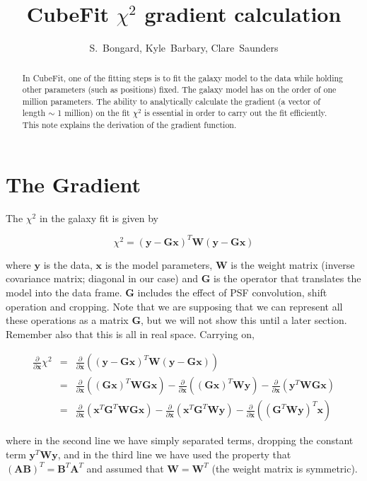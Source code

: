\documentclass[12pt]{article}
\newcommand{\G}{\mathbf{G}}
\newcommand{\x}{\mathbf{x}}
\newcommand{\y}{\mathbf{y}}
\newcommand{\W}{\mathbf{W}}
\newcommand{\ddx}{\frac{\partial}{\partial \mathbf{x}}}
\begin{document}
\title{CubeFit $\chi^2$ gradient calculation}
\author{S.~Bongard, Kyle~Barbary, Clare~Saunders}
\maketitle
\begin{abstract}
In CubeFit, one of the fitting steps is to fit the galaxy model to the
data while holding other parameters (such as positions) fixed. The
galaxy model has on the order of one million parameters. The ability to
analytically calculate the gradient (a vector of length $\sim$ 1
million) on the fit $\chi^2$ is essential in order to carry out the fit
efficiently. This note explains the derivation of the gradient function.
\end{abstract}


\section{The Gradient}

The $\chi^2$ in the galaxy fit is given by

\begin{equation}
\chi^2 = (\y - \G\x)^T \W (\y - \G\x)
\end{equation}

\noindent where $\y$ is the data, $\x$ is the model parameters, $\W$
is the weight matrix (inverse covariance matrix; diagonal in our case)
and $\G$ is the operator that translates the model into the data
frame. $\G$ includes the effect of PSF convolution, shift operation
and cropping. Note that we are supposing that we can represent all
these operations as a matrix $\G$, but we will not show this until a
later section. Remember also that this is all in real space.  Carrying
on,

\begin{eqnarray*}
  \label{eq:5}
  \ddx \chi^{2} & = & \ddx \left( (\y - \G\x)^{T} \W (\y - \G\x) \right)\\
                & = & \ddx \left( (\G \x)^{T} \W \G \x \right)
                    - \ddx \left( (\G \x)^{T} \W \y \right)
                    - \ddx \left( \y^{T} \W \G \x \right) \\
                & = & \ddx \left( \x^{T} \G^{T} \W \G \x \right)
                    - \ddx \left( \x^{T} \G^{T} \W \y \right)
                    - \ddx \left( (\G^{T} \W \y)^{T} \x \right)
\end{eqnarray*}

\noindent where in the second line we have simply separated terms, dropping the
constant term $\y^T \W \y$, and in the third line we have used the property
that $(\mathbf{A}\mathbf{B})^T = \mathbf{B}^T\mathbf{A}^T$ and assumed that
$\W = \W^T$ (the weight matrix is symmetric).
\end{document}
